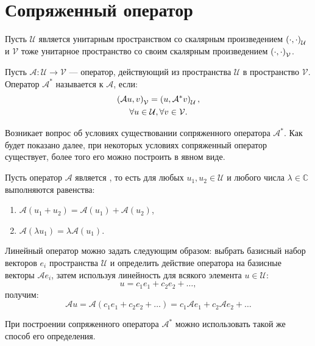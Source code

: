 \section{Сопряженный оператор}

Пусть $\mathcal{U}$ является унитарным пространством со скалярным произведением $\left ( \cdot, \cdot \right )_\mathcal{U}$ и $\mathcal{V}$ тоже унитарное пространство
со своим скалярным произведением $\left ( \cdot, \cdot \right )_\mathcal{V}$.

Пусть $\mathcal{A} : \mathcal{U} \rightarrow \mathcal{V}$ --- оператор, действующий из пространства $\mathcal{U}$ в пространство $\mathcal{V}$.
Оператор $\mathcal{A}^*$ называется  к $\mathcal{A}$, если:
\begin{gather}
    \left ( \mathcal{A} u, v \right )_{\mathcal{V}} = \left ( u, \mathcal{A}^* v \right )_{\mathcal{U}}
    \label{rayleigh:operator:scalars_equality}, \\
    \forall u \in \mathcal{U}, \forall v \in \mathcal{V}
    \notag.
\end{gather}

Возникает вопрос об условиях существовании сопряженного оператора $\mathcal{A}^*$. Как будет показано далее, при некоторых условиях сопряженный оператор существует,
более того его можно построить в явном виде.

Пусть оператор $\mathcal{A}$ является , то есть для любых $u_1, u_2 \in \mathcal{U}$ и любого числа $\lambda \in \mathbb{C}$ выполняются равенства:
\begin{enumerate}
    \item $\mathcal{A}(u_1 + u_2) = \mathcal{A}(u_1) + \mathcal{A}(u_2)$,
    \item $\mathcal{A}(\lambda u_1) = \lambda \mathcal{A}(u_1)$.
\end{enumerate}

Линейный оператор можно задать следующим образом: выбрать базисный набор векторов $e_i$ пространства $\mathcal{U}$ и определить действие оператора на базисные векторы
$\mathcal{A} e_i$, затем используя линейность для всякого элемента $u \in \mathcal{U}$:
\[
    u = c_1 e_1 + c_2 e_2 + \dots,
\]
получим:
\[
    \mathcal{A} u
    = \mathcal{A} ( c_1 e_1 + c_2 e_2 + \dots )
    = c_1 \mathcal{A} e_1 + c_2 \mathcal{A} e_2 + \dots
\]

При построении сопряженного оператора $\mathcal{A}^*$ можно использовать такой же способ его определения.

